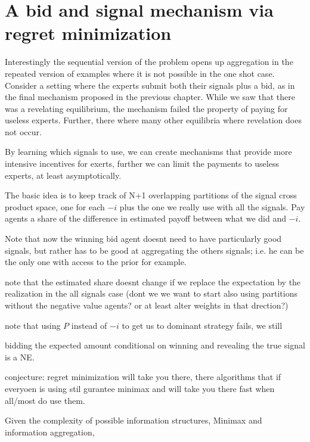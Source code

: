 

\section{A bid and signal mechanism via regret minimization}

Interestingly the sequential version of the problem opens up aggregation in the repeated version of examples where it is not possible in the one shot case. Consider a setting where the experts submit both their signals plus a bid, as in the final mechanism proposed in the previous chapter. While we saw that there was a revelating equilibrium, the mechanism failed the property of paying for useless experts. Further, there where many other equilibria where revelation does not occur. 

By learning which signals to use, we can create mechanisms that provide more intensive incentives for exerts, further we can limit the payments to useless experts, at least asymptotically. 


The basic idea is to keep track of N+1 overlapping partitions of the signal cross product space, one for each $-i$ plus the one we really use with all the signals. Pay agents a share of the difference in estimated payoff between what we did and $-i$.

Note that now the winning bid agent doesnt need to have particularly good signals, but rather has to be good at aggregating the others signals; i.e. he can be the only one with access to the prior for example.


note that the estimated share doesnt change if we replace the expectation by the realization in the all signals case (dont we we want to start also using partitions without the negative value agents? or at least alter weights in that drection?)

note that using $P$ instead of $-i$ to get us to dominant strategy fails, we still 

bidding the expected amount conditional on winning and revealing the true signal is a NE.

conjecture: regret minimization will take you there, there algorithms that if everyoen is using stil gurantee minimax and will take you there fast when all/most do use them.

Given the complexity of possible information structures,
Minimax and information aggregation, 





